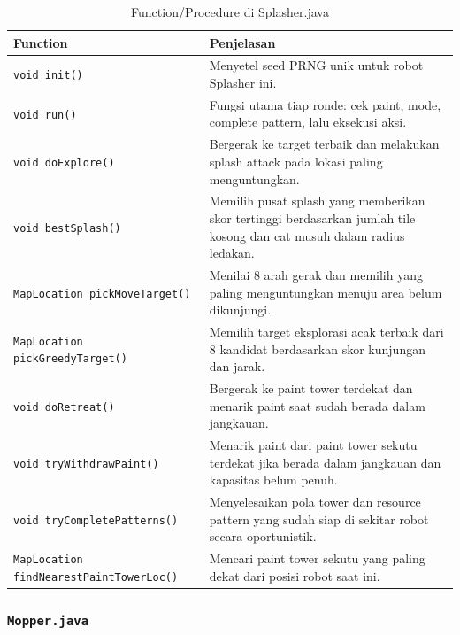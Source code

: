 \documentclass{article}
\begin{document}
\begin{enumerate}[label=\alph*.]
\begin{longtable}{|p{}|p{}|}
    \caption{Function/Procedure di Splasher.java} \\
\hline
\textbf{Function} & \textbf{Penjelasan} \\
\hline
\endhead
\hline
\endfoot
\texttt{void init()} & Menyetel seed PRNG unik untuk robot Splasher ini. \\
\hline
\texttt{void run()} & Fungsi utama tiap ronde: cek paint, mode, complete pattern, lalu eksekusi aksi. \\
\hline
\texttt{void doExplore()} & Bergerak ke target terbaik dan melakukan splash attack pada lokasi paling menguntungkan. \\
\hline
\texttt{void bestSplash()} & Memilih pusat splash yang memberikan skor tertinggi berdasarkan jumlah tile kosong dan cat musuh dalam radius ledakan. \\
\hline
\texttt{MapLocation pickMoveTarget()} & Menilai 8 arah gerak dan memilih yang paling menguntungkan menuju area belum dikunjungi. \\
\hline
\texttt{MapLocation pickGreedyTarget()} & Memilih target eksplorasi acak terbaik dari 8 kandidat berdasarkan skor kunjungan dan jarak. \\
\hline
\texttt{void doRetreat()} & Bergerak ke paint tower terdekat dan menarik paint saat sudah berada dalam jangkauan. \\
\hline
\texttt{void tryWithdrawPaint()} & Menarik paint dari paint tower sekutu terdekat jika berada dalam jangkauan dan kapasitas belum penuh. \\
\hline
\texttt{void tryCompletePatterns()} & Menyelesaikan pola tower dan resource pattern yang sudah siap di sekitar robot secara oportunistik. \\
\hline
\texttt{MapLocation findNearestPaintTowerLoc()} & Mencari paint tower sekutu yang paling dekat dari posisi robot saat ini. \\
\hline
\end{longtable}

\subsubsection{\lstinline|Mopper.java|}


\end{enumerate}
\end{document}
